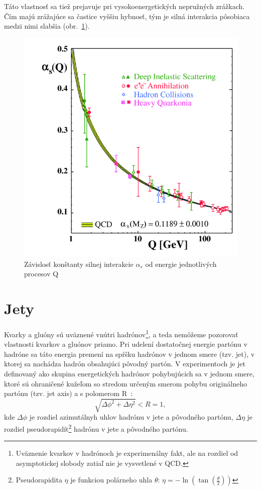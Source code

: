 \documentclass[thesismargins, thesislinespacing]{rnthesis}
\begin{document}
Táto vlastnosť sa tiež prejavuje pri vysokoenergetických nepružných zrážkach. Čím majú zrážajúce sa častice vyššiu hybnosť, tým je silná interakcia pôsobiaca medzi nimi slabšia (obr.~\ref{alfa}).
\begin{figure}
	\centering
	\includegraphics[scale=0.4]{./Obrazky_praca/zrazka.png}
	\caption{Závislosť konštanty silnej interakcie $\alpha_s$ od energie jednotlivých procesov Q \cite{3}}
	\label{alfa}
\end{figure}


\section{Jety}

Kvarky a gluóny sú uväznené vnútri hadrónov\footnote{Uväznenie kvarkov v hadrónoch je experimenálny fakt, ale na rozdiel od asymptotickej slobody zatiaľ nie je vysvetlené v QCD.}, a teda nemôžeme pozorovať vlastnosti kvarkov a gluónov priamo. Pri udelení dostatočnej energie partónu v hadróne sa táto energia premení na spŕšku hadrónov v jednom smere (tzv. jet), v ktorej sa nachádza hadrón obsahujúci pôvodný partón. V experimentoch je jet definovaný ako skupina energe\-tických hadrónov pohybujúcich sa v jednom smere, ktoré sú ohraničené kužeľom so stredom určeným smerom pohybu originálneho partónu (tzv. jet axis) a s polomerom R~\cite{4}:
\begin{equation}
\sqrt{\Delta \phi^2 + \Delta \eta^2}<R=1,
\end{equation}
kde $\Delta \phi$ je rozdiel azimutálnyh uhlov hadrónu v jete a pôvodného partónu, $\Delta \eta$ je rozdiel pseudorapidít\footnote{Pseudorapidita $\eta$ je funkciou polárneho uhla $\theta$: $\eta = - \ln( \tan (\frac{\theta}{2}))$} hadrónu v jete a pôvodného partónu.
\end{document}
